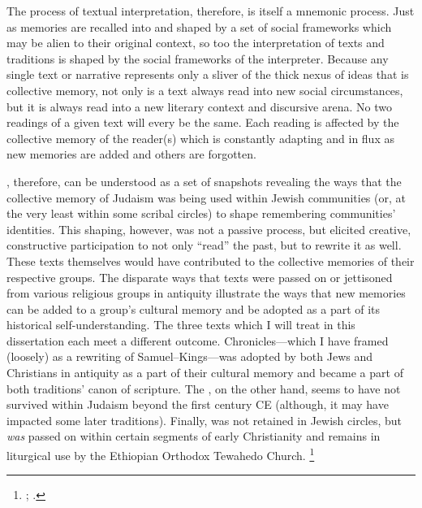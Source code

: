 The process of textual interpretation, therefore, is itself a mnemonic process. Just as memories are recalled into and shaped by a set of social frameworks which may be alien to their original context, so too the interpretation of texts and traditions is shaped by the social frameworks of the interpreter. Because any single text or narrative represents only a sliver of the thick nexus of ideas that is collective memory, not only is a text always read into new social circumstances, but it is always read into a new literary context and discursive arena. No two readings of a given text will every be the same. Each reading is affected by the collective memory of the reader(s) which is constantly adapting and in flux as new memories are added and others are forgotten.  

\RwB, therefore, can be understood as a set of snapshots revealing the ways that the collective memory of \secondtemple Judaism was being used within Jewish communities (or, at the very least within some scribal circles) to shape remembering communities' identities. This shaping, however, was not a passive process, but elicited creative, constructive participation to not only ``read'' the past, but to rewrite it as well. These texts themselves would have contributed to the collective memories of their respective groups. The disparate ways that \rwb texts were passed on or jettisoned from various religious groups in antiquity illustrate the ways that new memories can be added to a group's cultural memory and be adopted as a part of its historical self-understanding. The three texts which I will treat in this dissertation each meet a different outcome. Chronicles---which I have framed (loosely) as a rewriting of Samuel--Kings---was adopted by both Jews and Christians in antiquity as a part of their cultural memory and became a part of both traditions' canon of scripture. The \ga, on the other hand, seems to have not survived within Judaism beyond the first century CE (although, it may have impacted some later traditions). Finally, \jub was not retained in Jewish circles, but \emph{was} passed on within certain segments of early Christianity and remains in liturgical use by the Ethiopian Orthodox Tewahedo Church.%
%
\footnote{\cite{baynes_mason-etal2012}; \cite{asale_bt2016}.}

